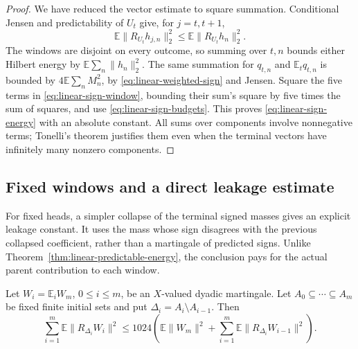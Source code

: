\begin{proof}
We have reduced the vector estimate to square summation.  Conditional
Jensen and predictability of \(U_t\) give, for \(j=t,t+1\),
\[
 \mathbb E\|R_{U_t}h_{j,n}\|_2^2
 \le\mathbb E\|R_{U_t}h_n\|_2^2.
\]
The windows are disjoint on every outcome, so summing over \(t,n\)
bounds either Hilbert energy by \(\mathbb E\sum_n\|h_n\|_2^2\).
The same summation for \(q_{t,n}\) and \(\mathbb E_tq_{t,n}\) is
bounded by \(4\mathbb E\sum_nM_n^2\), by
\eqref{eq:linear-weighted-sign} and Jensen.  Square the five terms in
\eqref{eq:linear-sign-window}, bounding their sum's square by five
times the sum of squares, and use \eqref{eq:linear-sign-budgets}.
This proves \eqref{eq:linear-sign-energy} with an absolute constant.
All sums over components involve nonnegative terms; Tonelli's theorem
justifies them even when the terminal vectors have infinitely many
nonzero components.
\end{proof}

\subsection{Fixed windows and a direct leakage estimate}

For fixed heads, a simpler collapse of the terminal signed masses gives
an explicit leakage constant.  It uses the mass whose sign disagrees
with the previous collapsed coefficient, rather than a martingale of
predicted signs.  Unlike Theorem~\ref{thm:linear-predictable-energy},
the conclusion pays for the actual parent contribution to each window.

\begin{theorem}\label{thm:linear-leakage-energy}
Let \(W_i=\mathbb E_iW_m\), \(0\le i\le m\), be an \(X\)-valued dyadic
martingale.  Let \(A_0\subseteq\cdots\subseteq A_m\) be fixed finite
initial sets and put \(\Delta_i=A_i\setminus A_{i-1}\).  Then
\begin{equation}\label{eq:linear-leakage-1024}
 \sum_{i=1}^m\mathbb E\|R_{\Delta_i}W_i\|^2
 \le1024\left(\mathbb E\|W_m\|^2+
              \sum_{i=1}^m\mathbb E\|R_{\Delta_i}W_{i-1}\|^2\right).
\end{equation}
\end{theorem}

